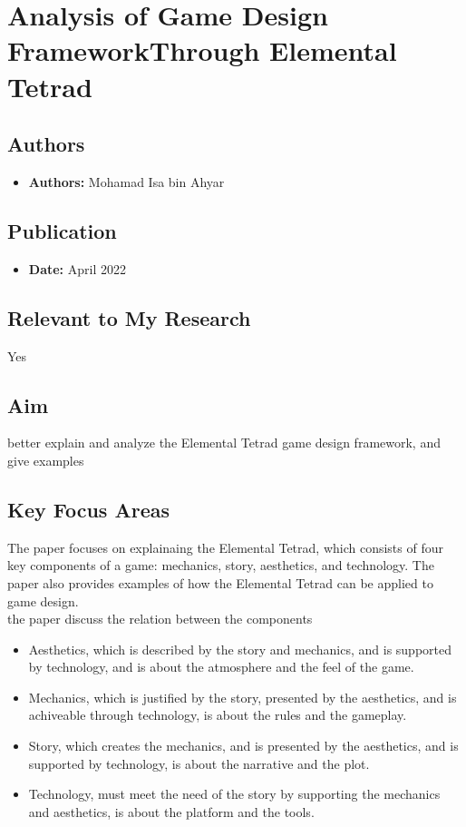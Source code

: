 \section{Analysis of Game Design FrameworkThrough Elemental Tetrad}

\subsection{Authors}
\begin{itemize}
    \item \textbf{Authors:} Mohamad Isa bin Ahyar
\end{itemize}

\subsection{Publication}
\begin{itemize}
    \item \textbf{Date:} April 2022
\end{itemize}

\subsection{Relevant to My Research}
Yes

\subsection{Aim}
better explain and analyze the Elemental Tetrad game design framework, and give examples

\subsection{Key Focus Areas}
The paper focuses on explainaing the Elemental Tetrad, which consists of four key components of a game: mechanics, story, aesthetics, and technology. The paper also provides examples of how the Elemental Tetrad can be applied to game design.
\\
the paper discuss the relation between the components
\begin{itemize}
    \item Aesthetics, which is described by the story and mechanics, and is supported by technology, and is about the atmosphere and the feel of the game.
    \item Mechanics, which is justified by the story, presented by the aesthetics, and is achiveable through technology, is about the rules and the gameplay.
    \item Story, which creates the mechanics, and is presented by the aesthetics, and is supported by technology, is about the narrative and the plot.
    \item Technology, must meet the need of the story by supporting the mechanics and aesthetics, is about the platform and the tools.
\end{itemize}

